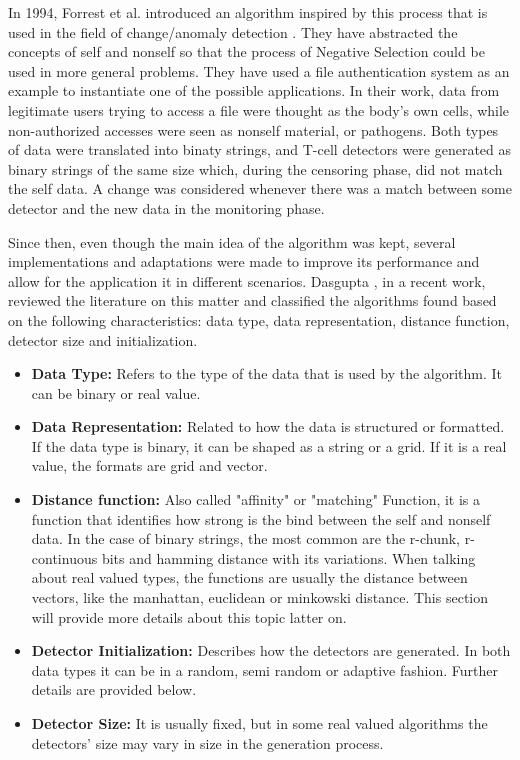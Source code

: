 In 1994, Forrest et al. introduced an algorithm inspired by this process that is used in the field of change/anomaly detection \cite{Forrest1994}. They have abstracted the concepts of self and nonself so that the process of Negative Selection could be used in more general problems. They have used a file authentication system as an example to instantiate one of the possible applications. In their work, data from legitimate users trying to access a file were thought as the body's own cells, while non-authorized accesses were seen as nonself material, or pathogens. Both types of data were translated into binaty strings, and T-cell detectors were generated as binary strings of the same size which, during the censoring phase, did not match the self data. A change was considered whenever there was a match between some detector and the new data in the monitoring phase.

Since then, even though the main idea of the algorithm was kept, several implementations and adaptations were made to improve its performance and allow for the application it in different scenarios. Dasgupta \cite{NSAResearch2021}, in a recent work, reviewed the literature on this matter and classified the algorithms found based on the following characteristics: data type, data representation, distance function, detector size and initialization.

\begin{itemize}
    \item \textbf{Data Type:} Refers to the type of the data that is used by the algorithm. It can be binary or real value.
    
    \item \textbf{Data Representation:} Related to how the data is structured or formatted. If the data type is binary, it can be shaped as a string or a grid. If it is a real value, the formats are grid and vector. 
    
    \item \textbf{Distance function:} Also called "affinity" or "matching" Function, it is a function that identifies how strong is the bind between the self and nonself data. In the case of binary strings, the most common are the r-chunk, r-continuous bits and hamming distance with its variations. When talking about real valued types, the functions are usually the distance between vectors, like the manhattan, euclidean or minkowski distance. This section will provide more details about this topic latter on.
    
    \item \textbf{Detector Initialization:} Describes how the detectors are generated. In both data types it can be in a random, semi random or adaptive fashion. Further details are provided below.
    
    \item \textbf{Detector Size:} It is usually fixed, but in some real valued algorithms the detectors' size may vary in size in the generation process.
    
\end{itemize}

